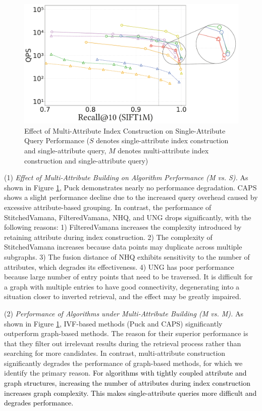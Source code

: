 \documentclass[sigconf, nonacm, pdfa]{acmart}
\begin{document}
{\begin{figure}[t]
		
		\includegraphics[width=0.7\columnwidth]{figures/exp/exp_2_1.pdf}
		\caption{Effect of Multi-Attribute Index Construction on Single-Attribute Query Performance ($S$ denotes single-attribute index construction and single-attribute query, $M$ denotes multi-attribute index construction and single-attribute query)}
		\label{fig:exp_2_1}
		
	\end{figure}
	
	(1) \textit{Effect of Multi-Attribute Building on Algorithm Performance (M vs. S).}
	As shown in Figure \ref{fig:exp_2_1}, Puck demonstrates nearly no performance degradation. CAPS shows a slight performance decline due to the increased query overhead caused by excessive attribute-based grouping. In contrast, the performance of StitchedVamana, FilteredVamana, NHQ, and UNG drops significantly, with the following reasons: 1) FilteredVamana increases the complexity introduced by retaining attribute during index construction. 2) The complexity of StitchedVamana increases because data points may duplicate across multiple subgraphs. 3) The fusion distance of NHQ exhibits sensitivity to the number of attributes, which degrades its effectiveness. 4) UNG has poor performance because large number of entry points that need to be traversed. It is difficult for a graph with multiple entries to have good connectivity, degenerating into a situation closer to inverted retrieval, and the effect may be greatly impaired.
	
	
	
	(2) \textit{Performance of Algorithms under Multi-Attribute Building (M vs. M).}  
	As shown in Figure \ref{fig:exp_2_1}, IVF-based methods (Puck and CAPS) significantly outperform graph-based methods. The reason for their superior performance is that they filter out irrelevant results during the retrieval process rather than searching for more candidates. In contrast, multi-attribute construction significantly degrades the performance of graph-based methods, for which we identify the primary reason. 
	\textcolor{black}{For algorithms with tightly coupled attribute and graph structures, increasing the number of attributes during index construction increases graph complexity. This makes single-attribute queries more difficult and degrades performance.}

}
\end{document}
